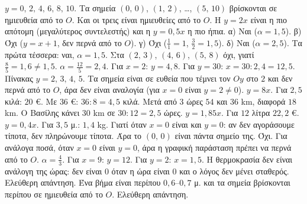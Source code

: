  $y=0,\,2,\,4,\,6,\,8,\,10$. Τα σημεία $(0,\,0)$, $(1,\,2)$, \dots, $(5,\,10)$ βρίσκονται σε ημιευθεία από το $O$.
 Και οι τρεις είναι ημιευθείες από το $O$. Η $y=2x$ είναι η πιο απότομη (μεγαλύτερος συντελεστής) και η $y=0{,}5x$ η πιο ήπια.
 α) Ναι ($\alpha=1{,}5$). β) Όχι ($y=x+1$, δεν περνά από το $O$). γ) Όχι ($\frac{1}{1}=1$, $\frac{3}{2}=1{,}5$). δ) Ναι ($\alpha=2{,}5$).
 Τα πρώτα τέσσερα: ναι, $\alpha=1{,}5$. Στα $(2,\,3)$, $(4,\,6)$, $(5,\,8)$ όχι, γιατί $\frac{8}{5}=1{,}6\neq1{,}5$.
 $\alpha=\frac{12}{5}=2{,}4$. Για $x=2$: $y=4{,}8$. Για $y=30$: $x=30:2{,}4=12{,}5$.
 Πίνακας $y=2,\,3,\,4,\,5$. Τα σημεία είναι σε ευθεία που τέμνει τον $Oy$ στο $2$ και δεν περνά από το $O$, άρα δεν είναι αναλογία (για $x=0$ είναι $y=2\neq0$).
 $y=8x$. Για $2{,}5$ κιλά: $20$ €. Με $36$ €: $36:8=4{,}5$ κιλά.
 Μετά από $3$ ώρες $54$ και $36$ km, διαφορά $18$ km. Ο Βασίλης κάνει $30$ km σε $30:12=2{,}5$ ώρες.
 $y=1{,}85x$. Για $12$ λίτρα $22{,}2$ €.
 $y=0{,}4x$. Για $3{,}5$ μ.: $1{,}4$ kg.
 Γιατί όταν $x=0$ είναι και $y=0$: αν δεν αγοράσουμε τίποτα, δεν πληρώνουμε τίποτα. Άρα το $(0,\,0)$ είναι πάντα σημείο της.
 Όχι. Για ανάλογα ποσά, όταν $x=0$ είναι $y=0$, άρα η γραφική παράσταση πρέπει να περνά από το $O$.
 $\alpha=\frac{4}{3}$. Για $x=9$: $y=12$. Για $y=2$: $x=1{,}5$.
 Η θερμοκρασία δεν είναι ανάλογη της ώρας: δεν είναι $0$ όταν η ώρα είναι $0$ και ο λόγος δεν μένει σταθερός.
 Ελεύθερη απάντηση. Ένα βήμα είναι περίπου $0{,}6$--$0{,}7$ μ. και τα σημεία βρίσκονται περίπου σε ημιευθεία από το $O$.
 Ελεύθερη απάντηση.
